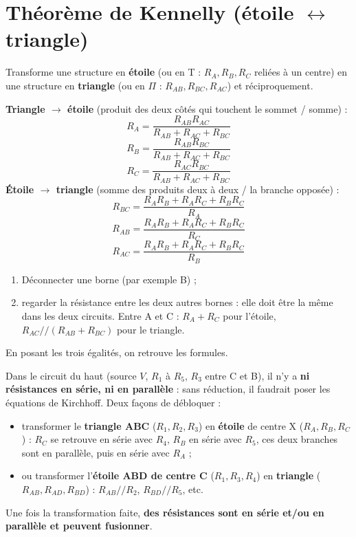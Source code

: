 \section{Théorème de Kennelly (étoile $\leftrightarrow$ triangle)}


\begin{thmbox}[title=Théorème de Kennelly]
Transforme une structure en \textbf{étoile} (ou en T : $R_A, R_B, R_C$ reliées à un centre)
en une structure en \textbf{triangle} (ou en $\Pi$ : $R_{AB}, R_{BC}, R_{AC}$) et
réciproquement.

\textbf{Triangle $\to$ étoile} (produit des deux côtés qui touchent le sommet / somme) :
\[ R_A = \frac{R_{AB} R_{AC}}{R_{AB}+R_{AC}+R_{BC}} \]
\[ R_B = \frac{R_{AB} R_{BC}}{R_{AB}+R_{AC}+R_{BC}} \]
\[ R_C = \frac{R_{AC} R_{BC}}{R_{AB}+R_{AC}+R_{BC}} \]
\textbf{Étoile $\to$ triangle} (somme des produits deux à deux / la branche opposée) :
\[ R_{BC} = \frac{R_A R_B + R_A R_C + R_B R_C}{R_A} \]
\[ R_{AB} = \frac{R_A R_B + R_A R_C + R_B R_C}{R_C} \]
\[ R_{AC} = \frac{R_A R_B + R_A R_C + R_B R_C}{R_B} \]
\end{thmbox}

\begin{proofbox}[title=Méthode de démonstration]
\begin{enumerate}
  \item Déconnecter une borne (par exemple B) ;
  \item regarder la résistance entre les deux autres bornes : elle doit être la même dans
        les deux circuits. Entre A et C : $R_A + R_C$ pour l'étoile,
        $R_{AC}/\!/(R_{AB}+R_{BC})$ pour le triangle.
\end{enumerate}
En posant les trois égalités, on retrouve les formules.
\end{proofbox}


\begin{exbox}[title={Pourquoi Kennelly : calculer le courant $I$ d'un pont}]
Dans le circuit du haut (source $V$, $R_1$ à $R_5$, $R_3$ entre C et B), il n'y a
\textbf{ni résistances en série, ni en parallèle} : sans réduction, il faudrait poser les
équations de Kirchhoff. Deux façons de débloquer :
\begin{itemize}
  \item transformer le \textbf{triangle ABC} ($R_1, R_2, R_3$) en \textbf{étoile} de centre
        X ($R_A, R_B, R_C$) : $R_C$ se retrouve en série avec $R_4$, $R_B$ en série avec
        $R_5$, ces deux branches sont en parallèle, puis en série avec $R_A$ ;
  \item ou transformer l'\textbf{étoile ABD de centre C} ($R_1, R_3, R_4$) en
        \textbf{triangle} ($R_{AB}, R_{AD}, R_{BD}$) : $R_{AB}/\!/R_2$, $R_{BD}/\!/R_5$, etc.
\end{itemize}
Une fois la transformation faite, \textbf{des résistances sont en série et/ou en parallèle et
peuvent fusionner}.
\end{exbox}

